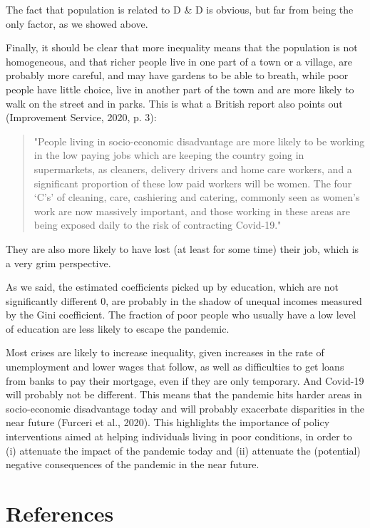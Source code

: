 \documentclass[a4paper]{article}
\theoremstyle{plain}
\theoremstyle{definition}
\begin{document}
The fact that population is related to D \& D is obvious, but far from being the only factor, as we showed above.

Finally, it should be clear that more inequality means that the population is not homogeneous, and that richer people live in one part of a town or a village, are probably more careful, and may have gardens to be able to breath, while poor people have little choice, live in another part of the town and are more likely to walk on the street and in parks.  This is what a British report also points out (Improvement Service, 2020, p. 3):

\begin{quote}
"People living in socio-economic disadvantage are more likely to be working in the
low paying jobs which are keeping the country going in supermarkets, as cleaners,
delivery drivers and home care workers, and a significant proportion of these low
paid workers will be women. The four `C's' of cleaning, care, cashiering and catering,
commonly seen as women's work are now massively important, and those working
in these areas are being exposed daily to the risk of contracting Covid-19."
\end{quote}

They are also more likely to have lost (at least for some time) their job, which is a very grim perspective.

As we said, the estimated coefficients picked up by education, which are not significantly different 0, are probably in the shadow of unequal incomes measured by the Gini coefficient. The fraction of poor people who usually have a low level of education  are less likely to escape the pandemic.

Most crises are likely to increase inequality, given increases in the rate of unemployment and lower wages that follow, as well as difficulties to get loans from banks to pay their mortgage, even if they are only temporary. And Covid-19 will probably not be different. 
This means that the pandemic hits harder areas in socio-economic disadvantage today and will probably exacerbate disparities in the near future (Furceri et al., 2020). This highlights the importance of policy interventions aimed at helping individuals living in poor conditions, in order to (i) attenuate the impact of the pandemic today and (ii) attenuate the (potential) negative consequences of the pandemic in the near future. \\


\newpage
\section{References}
\end{document}
